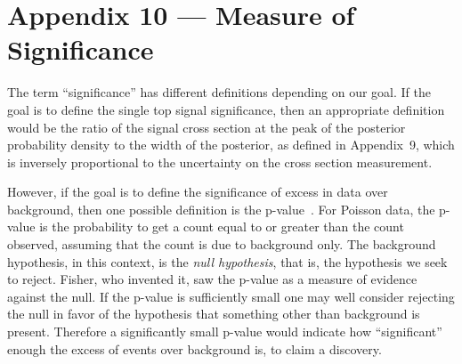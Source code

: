 %

\appendix
\section*{Appendix 10 --- Measure of Significance}
\label{appendix-significance}

The term ``significance'' has different definitions depending on our
goal. If the goal is to define the single top signal significance,
then an appropriate definition would be the ratio of the signal cross
section at the peak of the posterior probability density to the width
of the posterior, as defined in Appendix~9, which is inversely
proportional to the uncertainty on the cross section measurement.

However, if the goal is to define the significance of excess in data
over background, then one possible definition is the
p-value~\cite{Fisher}. For Poisson data, the p-value is the
probability to get a count equal to or greater than the count
observed, assuming that the count is due to background only. The
background hypothesis, in this context, is the {\em null hypothesis},
that is, the hypothesis we seek to reject. Fisher, who invented it,
saw the p-value as a measure of evidence against the null. If the
p-value is sufficiently small one may well consider rejecting the null
in favor of the hypothesis that something other than background is
present. Therefore a significantly small p-value would indicate how
``significant'' enough the excess of events over background is, to
claim a discovery.



